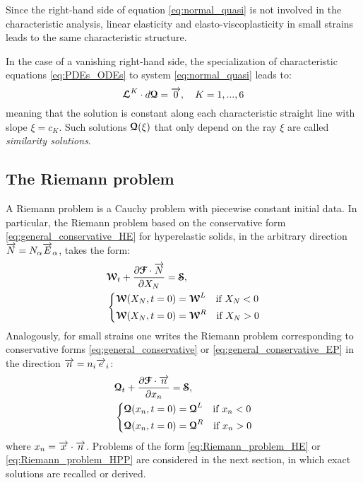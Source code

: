 \begin{remark}
  Since the right-hand side of equation \eqref{eq:normal_quasi} is not involved in the characteristic analysis, linear elasticity and elasto-viscoplasticity in small strains leads to the same characteristic structure. 
\end{remark}

\begin{remark}
  \label{rq:similarity_solution}
  In the case of a vanishing right-hand side, the specialization of characteristic equations \eqref{eq:PDEs_ODEs} to system \eqref{eq:normal_quasi} leads to:
\begin{equation}
  \label{eq:characteristic_equations_homogeneous}
  {\boldsymbol{\mathcal{L}}}^K \cdot d{\boldsymbol{\mathcal{Q}}} = {\overrightarrow{0}},\quad K=1,...,6
\end{equation}
meaning that the solution is constant along each characteristic straight line with slope $\xi = c_K$. Such solutions ${\boldsymbol{\mathcal{Q}}}(\xi)$ that only depend on the ray $\xi$ are called \textit{similarity solutions}.
\end{remark}

\subsection{The Riemann problem}
A Riemann problem is a Cauchy problem with piecewise constant initial data. In particular, the Riemann problem based on the conservative form \eqref{eq:general_conservative_HE} for hyperelastic solids, in the arbitrary direction ${\overrightarrow{N}}=N_\alpha {\overrightarrow{E}}_\alpha$, takes the form:
\begin{equation}
  \label{eq:Riemann_problem_HE}
  \begin{aligned}
    &{\boldsymbol{\mathcal{W}}}_t + \frac{\partial {\boldsymbol{\mathcal{F}}}\cdot {\overrightarrow{N}}}{\partial X_N} = {\boldsymbol{\mathcal{S}}}, \\
    &\left\lbrace 
      \begin{aligned}
        & {\boldsymbol{\mathcal{W}}}(X_N,t=0) = {\boldsymbol{\mathcal{W}}}^L \quad \text{if } X_N< 0\\
        & {\boldsymbol{\mathcal{W}}}(X_N,t=0) = {\boldsymbol{\mathcal{W}}}^R \quad \text{if } X_N> 0
      \end{aligned}
    \right.
  \end{aligned}
\end{equation}
Analogously, for small strains one writes the Riemann problem corresponding to conservative forms \eqref{eq:general_conservative} or \eqref{eq:general_conservative_EP} in the direction ${\overrightarrow{n}}=n_i {\overrightarrow{e}}_i$:
\begin{equation}
  \label{eq:Riemann_problem_HPP}
  \begin{aligned}
    &{\boldsymbol{\mathcal{Q}}}_t + \frac{\partial {\boldsymbol{\mathcal{F}}}\cdot {\overrightarrow{n}}}{\partial x_n} = {\boldsymbol{\mathcal{S}}}, \\
    &\left\lbrace 
      \begin{aligned}
        & {\boldsymbol{\mathcal{Q}}}(x_n,t=0) = {\boldsymbol{\mathcal{Q}}}^L \quad \text{if } x_n< 0\\
        & {\boldsymbol{\mathcal{Q}}}(x_n,t=0) = {\boldsymbol{\mathcal{Q}}}^R \quad \text{if } x_n> 0
      \end{aligned}
    \right.
  \end{aligned}
\end{equation}
where $x_n={\overrightarrow{x}}\cdot{\overrightarrow{n}}$.
Problems of the form \eqref{eq:Riemann_problem_HE} or \eqref{eq:Riemann_problem_HPP} are considered in the next section, in which exact solutions are recalled or derived.







